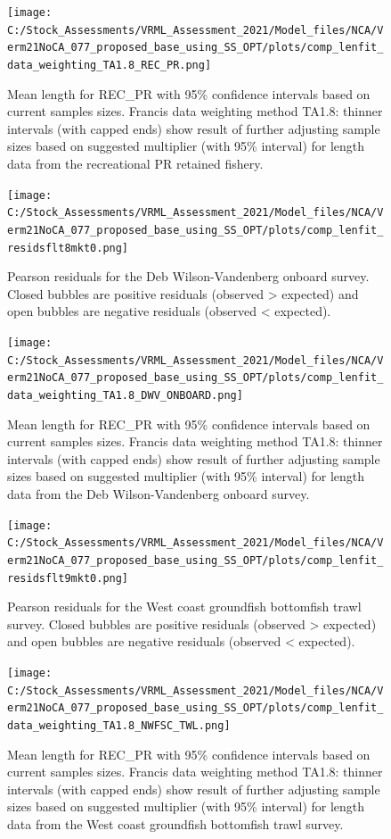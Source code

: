 \documentclass[11pt,
  english,
  a4paper,
]{article}
\begin{document}
\begin{figure}
\centering
\texttt{[image: C:/Stock\_Assessments/VRML\_Assessment\_2021/Model\_files/NCA/Verm21NoCA\_077\_proposed\_base\_using\_SS\_OPT/plots/comp\_lenfit\_data\_weighting\_TA1.8\_REC\_PR.png]}
\caption{Mean length for REC\_PR with 95\% confidence intervals based on current samples sizes. Francis data weighting method TA1.8: thinner intervals (with capped ends) show result of further adjusting sample sizes based on suggested multiplier (with 95\% interval) for length data from the recreational PR retained fishery.\label{fig:mean-len-fit-REC-PR}}
\end{figure}

\begin{figure}
\centering
\texttt{[image: C:/Stock\_Assessments/VRML\_Assessment\_2021/Model\_files/NCA/Verm21NoCA\_077\_proposed\_base\_using\_SS\_OPT/plots/comp\_lenfit\_residsflt8mkt0.png]}
\caption{Pearson residuals for the Deb Wilson-Vandenberg onboard survey. Closed bubbles are positive residuals (observed \textgreater{} expected) and open bubbles are negative residuals (observed \textless{} expected).\label{fig:len-pearson-DWV-ONBOARD}}
\end{figure}

\begin{figure}
\centering
\texttt{[image: C:/Stock\_Assessments/VRML\_Assessment\_2021/Model\_files/NCA/Verm21NoCA\_077\_proposed\_base\_using\_SS\_OPT/plots/comp\_lenfit\_data\_weighting\_TA1.8\_DWV\_ONBOARD.png]}
\caption{Mean length for REC\_PR with 95\% confidence intervals based on current samples sizes. Francis data weighting method TA1.8: thinner intervals (with capped ends) show result of further adjusting sample sizes based on suggested multiplier (with 95\% interval) for length data from the Deb Wilson-Vandenberg onboard survey.\label{fig:mean-len-fit-DWV-ONBOARD}}
\end{figure}

\begin{figure}
\centering
\texttt{[image: C:/Stock\_Assessments/VRML\_Assessment\_2021/Model\_files/NCA/Verm21NoCA\_077\_proposed\_base\_using\_SS\_OPT/plots/comp\_lenfit\_residsflt9mkt0.png]}
\caption{Pearson residuals for the West coast groundfish bottomfish trawl survey. Closed bubbles are positive residuals (observed \textgreater{} expected) and open bubbles are negative residuals (observed \textless{} expected).\label{fig:len-pearson-NWFSC-TWL}}
\end{figure}

\begin{figure}
\centering
\texttt{[image: C:/Stock\_Assessments/VRML\_Assessment\_2021/Model\_files/NCA/Verm21NoCA\_077\_proposed\_base\_using\_SS\_OPT/plots/comp\_lenfit\_data\_weighting\_TA1.8\_NWFSC\_TWL.png]}
\caption{Mean length for REC\_PR with 95\% confidence intervals based on current samples sizes. Francis data weighting method TA1.8: thinner intervals (with capped ends) show result of further adjusting sample sizes based on suggested multiplier (with 95\% interval) for length data from the West coast groundfish bottomfish trawl survey.\label{fig:mean-len-fit-NWFSC-TWL}}
\end{figure}
\end{document}
